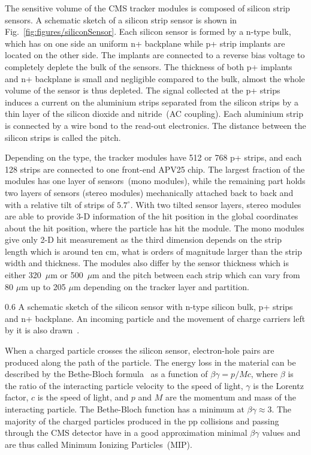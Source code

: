 The sensitive volume of the CMS tracker modules is composed of silicon strip sensors. A schematic sketch of a silicon strip sensor is shown in Fig.~\ref{fig:figures/siliconSensor}. Each silicon sensor is formed by a n-type bulk, which has on one side an uniform n+ backplane while p+ strip implants are located on the other side. The implants are connected to a reverse bias voltage to completely deplete the bulk of the sensors. The thickness of both p+ implants and n+ backplane is small and negligible compared to the bulk, almost the whole volume of the sensor is thus depleted. The signal collected at the p+ strips induces a current on the aluminium strips separated from the silicon strips by a thin layer of the silicon dioxide and nitride~(AC coupling). Each aluminium strip is connected by a wire bond to the read-out electronics. The distance between the silicon strips is called the pitch.

Depending on the type, the tracker modules have 512 or 768 p+ strips, and each 128 strips are connected to one front-end APV25 chip. The largest fraction of the modules has one layer of sensors~(mono modules), while the remaining part holds two layers of sensors (stereo modules) mechanically attached back to back and with a relative tilt of strips of $5.7^{\circ}$. With two tilted sensor layers, stereo modules are able to provide 3-D information of the hit position in the global coordinates about the hit position, where the particle has hit the module. The mono modules give only 2-D hit measurement as the third dimension depends on the strip length which is around ten cm, what is orders of magnitude larger than the strip width and thickness. The modules also differ by the sensor thickness which is either 320~$\mu$m or 500~$\mu$m and the pitch between each strip which can vary from 80 $\mu$m up to 205 $\mu$m depending on the tracker layer and partition.

                 {0.6}       %
                 {A schematic sketch of the silicon sensor with n-type silicon bulk, p+ strips and n+ backplane. An incoming particle and the movement of charge carriers left by it is also drawn~\cite{website:sensor}. } %

When a charged particle crosses the silicon sensor, electron-hole pairs are produced along the path of the particle. The energy loss in the material can be described by the Bethe-Bloch formula~\cite{Groom:2000sm} as a function of $\beta\gamma = p/Mc$, where $\beta$ is the ratio of the interacting particle velocity to the speed of light, $\gamma$ is the Lorentz factor, $c$ is the speed of light, and $p$ and $M$ are the momentum and mass of the interacting particle. The Bethe-Bloch function has a minimum at $\beta\gamma \approx 3$. The majority of the charged particles produced in the pp collisions and passing through the CMS detector have in a good approximation minimal $\beta\gamma$ values and are thus called Minimum Ionizing Particles~(MIP).

